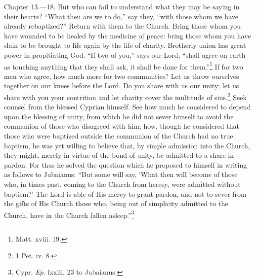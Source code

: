 Chapter 13.—18. But who can fail to understand what they may be saying in their hearts? ``What then are we to do,'' say they, ``with those whom we have already rebaptized?'' Return with them to the Church. Bring those whom you have wounded to be healed by the medicine of peace: bring those whom you have slain to be brought to life again by the life of charity. Brotherly union has great power in propitiating God. ``If two of you,'' says our Lord, ``shall agree on earth as touching anything that they shall ask, it shall be done for them.''\footnote{\par  Matt. xviii. 19.} If for two men who agree, how much more for two communities? Let us throw ourselves together on our knees before the Lord. Do you share with us our unity; let us share with you your contrition and let charity cover the multitude of sins.\footnote{\par  1 Pet. iv. 8.} Seek counsel from the blessed Cyprian himself. See how much he considered to depend upon the blessing of unity, from which he did not sever himself to avoid the communion of those who disagreed with him; how, though he considered that those who were baptized outside the communion of the Church had no true baptism, he was yet willing to believe that, by simple admission into the Church, they might, merely in virtue of the bond of unity, be admitted to a share in pardon. For thus he solved the question which he proposed to himself in writing as follows to Jubaianus: ``But some will say, ‘What then will become of those who, in times past, coming to the Church from heresy, were admitted without baptism?’ The Lord is able of His mercy to grant pardon, and not to sever from the gifts of His Church those who, being out of simplicity admitted to the Church, have in the Church fallen asleep.''\footnote{\par  Cypr. \emph{Ep.} lxxiii. 23 to Jubaianus.}


